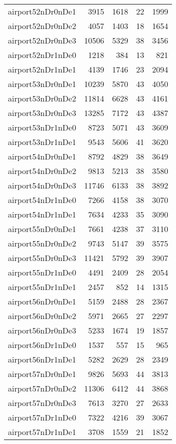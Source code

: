 \begin{longtable}{lrrrr}
airport52nDr0nDe1 & 3915 & 1618 & 22 & 1999 \\
airport52nDr0nDe2 & 4057 & 1403 & 18 & 1654 \\
airport52nDr0nDe3 & 10506 & 5329 & 38 & 3456 \\
airport52nDr1nDe0 & 1218 & 384 & 13 & 821 \\
airport52nDr1nDe1 & 4139 & 1746 & 23 & 2094 \\
airport53nDr0nDe1 & 10239 & 5870 & 43 & 4050 \\
airport53nDr0nDe2 & 11814 & 6628 & 43 & 4161 \\
airport53nDr0nDe3 & 13285 & 7172 & 43 & 4387 \\
airport53nDr1nDe0 & 8723 & 5071 & 43 & 3609 \\
airport53nDr1nDe1 & 9543 & 5606 & 41 & 3620 \\
airport54nDr0nDe1 & 8792 & 4829 & 38 & 3649 \\
airport54nDr0nDe2 & 9813 & 5213 & 38 & 3580 \\
airport54nDr0nDe3 & 11746 & 6133 & 38 & 3892 \\
airport54nDr1nDe0 & 7266 & 4158 & 38 & 3070 \\
airport54nDr1nDe1 & 7634 & 4233 & 35 & 3090 \\
airport55nDr0nDe1 & 7661 & 4238 & 37 & 3110 \\
airport55nDr0nDe2 & 9743 & 5147 & 39 & 3575 \\
airport55nDr0nDe3 & 11421 & 5792 & 39 & 3907 \\
airport55nDr1nDe0 & 4491 & 2409 & 28 & 2054 \\
airport55nDr1nDe1 & 2457 & 852 & 14 & 1315 \\
airport56nDr0nDe1 & 5159 & 2488 & 28 & 2367 \\
airport56nDr0nDe2 & 5971 & 2665 & 27 & 2297 \\
airport56nDr0nDe3 & 5233 & 1674 & 19 & 1857 \\
airport56nDr1nDe0 & 1537 & 557 & 15 & 965 \\
airport56nDr1nDe1 & 5282 & 2629 & 28 & 2349 \\
airport57nDr0nDe1 & 9826 & 5693 & 44 & 3813 \\
airport57nDr0nDe2 & 11306 & 6412 & 44 & 3868 \\
airport57nDr0nDe3 & 7613 & 3270 & 27 & 2633 \\
airport57nDr1nDe0 & 7322 & 4216 & 39 & 3067 \\
airport57nDr1nDe1 & 3708 & 1559 & 21 & 1852 \\

\end{longtable}
